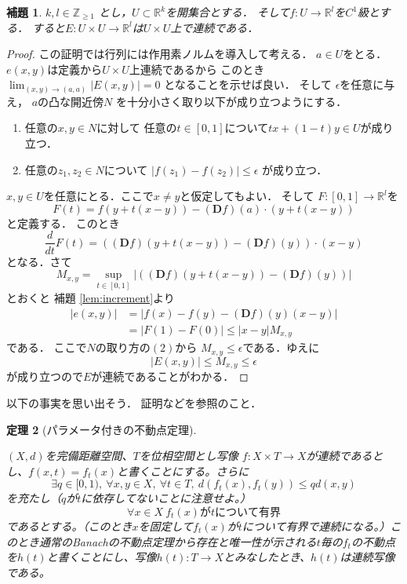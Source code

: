 \documentclass[leqno, a4paper, 12pt]{jsarticle}
\newtheorem{thm}{定理}
\newtheorem{lem}[thm]{補題}
\newcommand{\zz}{\mathbb{Z}}
\newcommand{\rr}{\mathbb{R}}
\newcommand{\ddd}{\mathbf{D}}
\begin{document}
\begin{lem}\label{lem:conti}
$k, l\in \zz_{\ge 1}$
とし，$U\subset \rr^{k}$を開集合とする．
そして$f: U\to \rr^{l}$を$C^{1}$級とする．
すると$E: U\times U\to \rr^{l}$は$U\times U$上で連続である．
\end{lem}
\begin{proof}
この証明では行列には作用素ノルムを導入して考える．
$a\in U$をとる．$e(x, y)$は定義から$U\times U$上連続であるから
このとき$\lim_{(x, y)\to (a, a)}|E(x, y)|=0$
となることを示せば良い．
そして
$\epsilon$を任意に与え，
$a$の凸な開近傍$N$
を十分小さく取り以下が成り立つようにする．
\begin{enumerate}
\item 
任意の$x, y\in N$に対して
任意の$t\in [0, 1]$について$tx+(1-t)y\in U$が成り立つ．
\item 
任意の$z_{1}, z_{2}\in N$について
$|f(z_{1})-f(z_{2})|\le \epsilon$
が成り立つ．
\end{enumerate}
$x, y\in U$を任意にとる．ここで$x\neq y$と仮定してもよい．
そして
$F: [0, 1] \to \rr^{l}$を
\[
F(t)=f(y+t(x-y))-(\ddd f)(a)\cdot (y+t(x-y))
\]
と定義する．
このとき
\[
\frac{d}{dt}F(t)=((\ddd f)(y+t(x-y))-(\ddd f)(y))\cdot (x-y)
\]
となる．さて
\[
M_{x, y}=\sup_{t\in [0, 1]}|((\ddd f)(y+t(x-y))-(\ddd f)(y))|
\]
とおくと
補題 \ref{lem:increment}より
\begin{align*}
|e(x, y)|&=
|f(x)-f(y)-(\ddd f)(y)(x-y)|
\\
&=
|F(1)-F(0)|\le 
|x-y|M_{x, y}
\end{align*}
である．
ここで$N$の取り方の$(2)$から
$M_{x, y}\le \epsilon$である．ゆえに
\[
|E(x, y)|\le M_{x,y}\le \epsilon
\]
が成り立つので$E$が連続であることがわかる．
\end{proof}

以下の事実を思い出そう．
証明\cite{3}などを参照のこと．

\begin{thm}[パラメータ付きの不動点定理]\label{thm:parabana}

$(X, d)$を完備距離空間、$T$を位相空間とし写像
$f:X\times T\to X$が連続であるとし、$f(x,t)=f_{t}(x)$と書くことにする。さらに
\[
\exists q\in [0,1), \ \forall x,y \in X, \ \forall t\in T, \ d(f_t(x),f_t(y))\le qd(x,y)
\]を充たし（$q$が$t$に依存してないことに注意せよ。）
\[
\forall x\in X\ f_t(x)がtについて有界
\]
であるとする。（このとき$x$を固定して$f_t(x)$が$t$について有界で連続になる。）このとき通常のBanachの不動点定理から存在と唯一性が示される$t$毎の$f_t$の不動点を$h(t)$と書くことにし、写像$h(t):T\to X$とみなしたとき、$h(t)$は連続写像である。
\end{thm}
\end{document}

